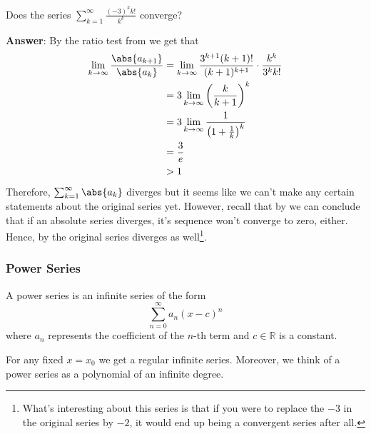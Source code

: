 \begin{exm}\label{exm-leibniz-test:4}
	Does the series $\sum_{k=1}^\infty \frac{(-3)^k k!}{k^k}$ converge?
	\begin{flushleft}
		\textbf{Answer}: By the ratio test from  we get that
		\begin{align*}
			\lim_{k\to\infty}\frac{\abs{a_{k+1}}}{\abs{a_k}}
			 & = \lim_{k\to\infty}\frac{3^{k+1}(k+1)!}{(k+1)^{k+1}}\cdot\frac{k^k}{3^k k!} \\
			 & = 3\lim_{k\to\infty}\left(\frac{k}{k+1}\right)^k                            \\
			 & = 3\lim_{k\to\infty}\frac{1}{\left(1+\frac{1}{k}\right)^k}                  \\
			 & = \frac{3}{e}                                                               \\
			 & > 1
		\end{align*}
		Therefore, $\sum_{k=1}^\infty \abs{a_k}$ diverges but it seems like we
		can't make any certain statements about the original series yet. However,
		recall that by  we can conclude that if an
		absolute series diverges, it's sequence won't converge to zero, either.
		Hence, by  the original
		series diverges as well\footnote{What's interesting about this series is that
			if you were to replace the $-3$ in the original series by $-2$, it would
			end up being a convergent series after all.}.
	\end{flushleft}
\end{exm}

\subsubsection{Power Series}\label{subsubsec-power-series}

\begin{definition}\label{def-power-series}
	A power series is an infinite series of the form
	\begin{equation}
		\sum_{n=0}^\infty a_n (x-c)^n
	\end{equation}
	where $a_n$ represents the coefficient of the $n$-th term and $c\in\mathbb{R}$
	is a constant.
\end{definition}

\begin{rem}\label{rem-power-series}
	For any fixed $x=x_0$ we get a regular infinite series. Moreover, we think of
	a power series as a polynomial of an infinite degree.
\end{rem}

